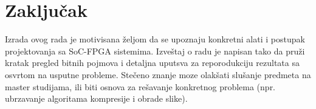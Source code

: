 \section{Zaključak}
Izrada ovog rada je motivisana željom da se upoznaju konkretni alati i postupak projektovanja sa SoC-FPGA sistemima. Izveštaj o radu je napisan tako da pruži kratak pregled bitnih pojmova i detaljna uputsva za reporodukciju rezultata sa osvrtom na usputne probleme. Stečeno znanje moze olakšati slušanje predmeta na master studijama, ili biti osnova za rešavanje konkretnog problema (npr. ubrzavanje algoritama kompresije i obrade slike).
